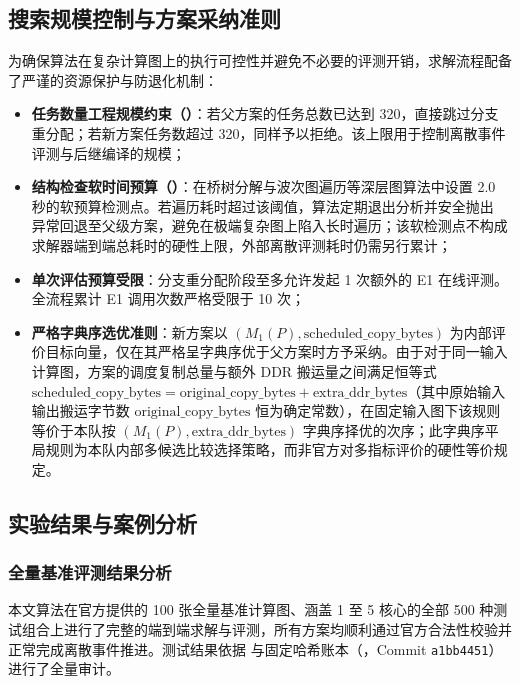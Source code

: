 \documentclass[anonymous,withtoc]{gmcm2026}
\providecommand{\tightlist}{\setlength{\itemsep}{0pt}\setlength{\parskip}{0pt}}
\begin{document}
\subsection{搜索规模控制与方案采纳准则}

为确保算法在复杂计算图上的执行可控性并避免不必要的评测开销，求解流程配备了严谨的资源保护与防退化机制：

\begin{itemize}
\tightlist
\item
  \textbf{任务数量工程规模约束（\texttt{}）}：若父方案的任务总数已达到 320，直接跳过分支重分配；若新方案任务数超过 320，同样予以拒绝。该上限用于控制离散事件评测与后继编译的规模；
\item
  \textbf{结构检查软时间预算（\texttt{}）}：在桥树分解与波次图遍历等深层图算法中设置 2.0 秒的软预算检测点。若遍历耗时超过该阈值，算法定期退出分析并安全抛出 \texttt{} 异常回退至父级方案，避免在极端复杂图上陷入长时遍历；该软检测点不构成求解器端到端总耗时的硬性上限，外部离散评测耗时仍需另行累计；
\item
  \textbf{单次评估预算受限}：分支重分配阶段至多允许发起 1 次额外的 E1 在线评测。全流程累计 E1 调用次数严格受限于 10 次；
\item
  \textbf{严格字典序选优准则}：新方案以 \((M_1(P), \text{scheduled\_copy\_bytes})\) 为内部评价目标向量，仅在其严格呈字典序优于父方案时方予采纳。由于对于同一输入计算图，方案的调度复制总量与额外 DDR 搬运量之间满足恒等式 \(\text{scheduled\_copy\_bytes} = \text{original\_copy\_bytes} + \text{extra\_ddr\_bytes}\)（其中原始输入输出搬运字节数 \(\text{original\_copy\_bytes}\) 恒为确定常数），在固定输入图下该规则等价于本队按 \((M_1(P), \text{extra\_ddr\_bytes})\) 字典序择优的次序；此字典序平局规则为本队内部多候选比较选择策略，而非官方对多指标评价的硬性等价规定。
\end{itemize}

\subsection{实验结果与案例分析}

\subsubsection{全量基准评测结果分析}

本文算法在官方提供的 100 张全量基准计算图、涵盖 1 至 5 核心的全部 500 种测试组合上进行了完整的端到端求解与评测，所有方案均顺利通过官方合法性校验并正常完成离散事件推进。测试结果依据 \texttt{} 与固定哈希账本（\texttt{}，Commit \texttt{a1bb4451}）进行了全量审计。
\end{document}
